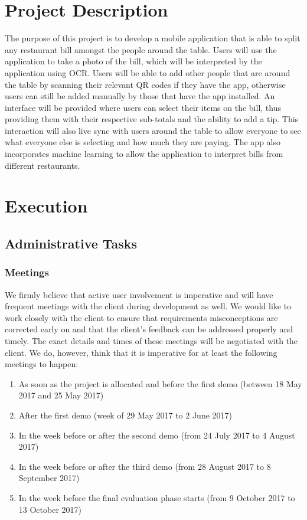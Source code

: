 \documentclass{article}
\begin{document}
\cleardoublepage
\thispagestyle{empty}
\tableofcontents
\newpage

\section{Project Description}
The purpose of this project is to develop a mobile application that is able to split any restaurant bill amongst the people around the table. Users will use the application to take a photo of the bill, which will be interpreted by the application using OCR. Users will be able to add other people that are around the table by scanning their relevant QR codes if they have the app, otherwise users can still be added manually by those that have the app installed. An interface will be provided where users can select their items on the bill, thus providing them with their respective sub-totals and the ability to add a tip. This interaction will also live sync with users around the table to allow everyone to see what everyone else is selecting and how much they are paying. The app also incorporates machine learning to allow the application to interpret bills from different restaurants.

\section{Execution}
    \subsection{Administrative Tasks}
        \subsubsection{Meetings}
            We firmly believe that active user involvement is imperative and will have frequent meetings with the client during development as well. We would like to work closely with the client to ensure that requirements misconceptions are corrected early on and that the client's feedback can be addressed properly and timely. The exact details and times of these meetings will be negotiated with the client. We do, however, think that it is imperative for at least the following meetings to happen:
            \begin{enumerate}
                \item As soon as the project is allocated and before the first demo (between 18 May 2017 and 25 May 2017)
                \item After the first demo (week of 29 May 2017 to 2 June 2017)
                \item In the week before or after the second demo (from 24 July 2017 to 4 August 2017)
                \item In the week before or after the third demo (from 28 August 2017 to 8 September 2017)
                \item In the week before the final evaluation phase starts (from 9 October 2017 to 13 October 2017)
            \end{enumerate}
\end{document}
